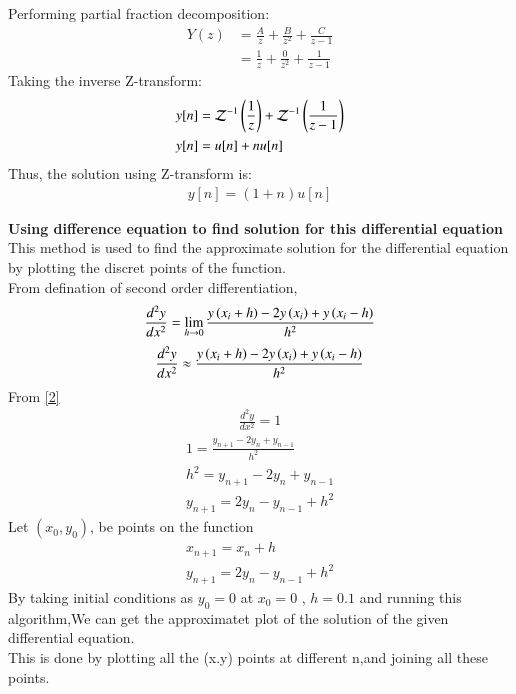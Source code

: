 \documentclass[journal]{IEEEtran}
\begin{document}
Performing partial fraction decomposition:
\begin{align}
    Y(z) &= \frac{A}{z} + \frac{B}{z^2} + \frac{C}{z-1}\\
    &= \frac{1}{z} + \frac{0}{z^2} + \frac{1}{z-1}
\end{align}
Taking the inverse Z-transform:
\begin{align}
    y[n] &= \mathcal{Z}^{-1}\left(\frac{1}{z}\right) + \mathcal{Z}^{-1}\left(\frac{1}{z-1}\right)\\
    y[n] &= u[n] + nu[n]
\end{align}
Thus, the solution using Z-transform is:
\begin{align}
    y[n] = (1+n)u[n]
\end{align}




\textbf{Using difference equation to find solution for this differential equation}
This method is used to find the approximate solution for the differential equation by plotting the discret points of the function.\\
From defination of second order differentiation,
\begin{align}
\frac{d^2y}{dx^2} = \lim\limits_{h \to 0} \frac{y\left(x_i+h\right)-2y\left(x_i\right)+y\left(x_i-h\right)}{h^2}
\end{align}
\begin{align}
\frac{d^2y}{dx^2} \approx \frac{y\left(x_i+h\right)-2y\left(x_i\right)+y\left(x_i-h\right)}{h^2}
\end{align}
From \eqref{2} \\
\begin{align}
\frac{d^2y}{dx^2} = 1 
\end{align}
\begin{align}
1 = \frac{y_{n+1}-2y_n+y_{n-1}}{h^2} \\
h^2 = y_{n+1}-2y_n+y_{n-1} \\
y_{n+1} = 2y_n-y_{n-1}+h^2 
\end{align}
Let $(x_0,y_0)$, be points on the function
\begin{align}
x_{n+1}=x_{n}+h \\
y_{n+1} = 2y_n-y_{n-1}+h^2 
\end{align}
By taking initial conditions as $y_0 = 0$ at $x_0 = 0$ , $h=0.1$ and running this algorithm,We can get the approximatet plot of the solution of the given differential equation.\\
This is done by plotting all the (x.y) points at different n,and joining all these points.
\end{document}
